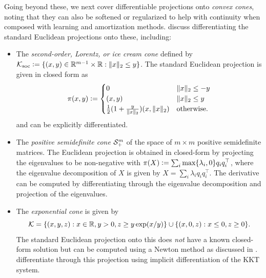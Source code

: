 \documentclass[twoside,11pt]{article}
\begin{document}
Going beyond these, we next cover differentiable projections onto
\emph{convex cones}, noting that they can also be softened or regularized
to help with continuity when composed with learning and
amortization methods.
\citet{ali2017semismooth,busseti2019solution} discuss
differentiating the standard Euclidean projections
onto these, including:
\begin{itemize}
\item
  \begin{minipage}[t]{0.65\textwidth}
  The \emph{second-order, Lorentz, or ice cream cone}
  defined by
  ${\mathcal{K}}_{\rm soc}\vcentcolon=\{(x,y)\in\mathbb{R}^{m-1}\times\mathbb{R} : \|x\|_2\leq y\}$.
  The standard Euclidean projection is given in closed form as
  \begin{equation}
    \pi(x, y) \vcentcolon=
    \begin{cases}
      0 & \|x\|_2 \leq -y \\
      (x,y) & \|x\|_2 \leq y \\
      \frac{1}{2} (1 + \frac{y}{\|x\|_2}) (x, \|x\|_2) & \textrm{otherwise}.
    \end{cases}
  \end{equation}
  and can be explicitly differentiated.
  \end{minipage}
  \hspace{8mm}
  \begin{minipage}[t]{0.2\textwidth}
  \vspace{-5mm}
  \end{minipage}
\item The \emph{positive semidefinite cone} ${\mathcal{S}}^m_+$ of the
  space of $m\times m$ positive semidefinite matrices.
  The Euclidean projection is obtained in closed-form
  by projecting the eigenvalues to be non-negative with
  $\pi(X)\vcentcolon=\sum_i\max\{\lambda_i, 0\}q_iq_i^\top$,
  where the eigenvalue decomposition of $X$ is given by
  $X=\sum_i\lambda_iq_iq_i^\top$.
  The derivative can be computed by differentiating
  through the eigenvalue decomposition and projection
  of the eigenvalues.
\item The \emph{exponential cone} is given by
  \begin{equation}
  {\mathcal{K}}=\{(x,y,z) : x\in\mathbb{R}, y>0, z\geq y\exp(x/y)\}\cup
  \{(x,0,z): x\leq0, z\geq 0\}.
  \label{eq:exp-cone}
  \end{equation}
  The standard Euclidean projection onto this does
  \emph{not} have a known closed-form solution
  but can be computed using a Newton method
  as discussed in
  \citep[\S6.3.4]{parikh2014proximal}.
  \citet{ali2017semismooth} differentiate through
  this projection using implicit differentiation
  of the KKT system.
\end{itemize}
\end{document}
